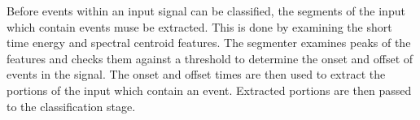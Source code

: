 Before events within an input signal can be classified, the segments of the input which contain events 
muse be extracted. This is done by examining the short time energy and spectral centroid features. 
The segmenter examines peaks of the features and checks them against a threshold to determine the onset and 
offset of events in the signal. The onset and offset times are then used to extract the portions
of the input which contain an event. Extracted portions are then passed to the classification
stage. 
